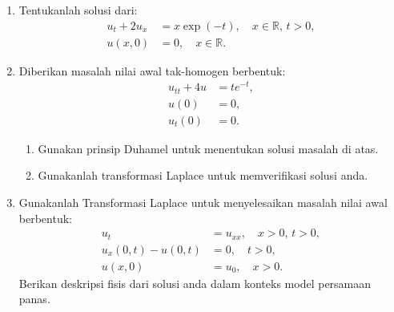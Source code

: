 \documentclass{article}
\begin{document}
\begin{enumerate}
\item Tentukanlah solusi dari:  
\begin{align*}
u_t + 2u_x &= x \exp(-t), \quad x \in \mathbb{R}, \, t > 0, \\
u(x, 0) &= 0, \quad x \in \mathbb{R}.
\end{align*}

\item Diberikan masalah nilai awal tak-homogen berbentuk:  
\begin{align*}
u_{tt} + 4u &= te^{-t}, \\
u(0) &= 0, \\
u_t(0) &= 0.
\end{align*}  
\begin{enumerate}
\item Gunakan prinsip Duhamel untuk menentukan solusi masalah di atas.  
\item Gunakanlah transformasi Laplace untuk memverifikasi solusi anda.  
\end{enumerate}

\item Gunakanlah Transformasi Laplace untuk menyelesaikan masalah nilai awal berbentuk:  
\begin{align*}
u_t &= u_{xx}, \quad x > 0, \, t > 0, \\
u_x(0, t) - u(0, t) &= 0, \quad t > 0, \\
u(x, 0) &= u_0, \quad x > 0.
\end{align*}  
Berikan deskripsi fisis dari solusi anda dalam konteks model persamaan panas.  

\end{enumerate}
\end{document}
